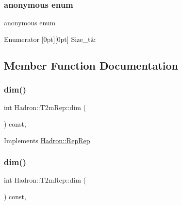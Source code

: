 \subsubsection{\texorpdfstring{anonymous enum}{anonymous enum}}
{\footnotesize\ttfamily anonymous enum}

\begin{DoxyEnumFields}{Enumerator}
[0pt][0pt]{}\mbox{\label{structHadron_1_1T2mRep_a417a4cdbefb5dafff1b57b70cbc10db8aa4b0f5962e540dfe4d59e9ece3dfdada}} 
Size\+\_\+t&\\
\hline

\end{DoxyEnumFields}


\subsection{Member Function Documentation}
\mbox{\label{structHadron_1_1T2mRep_abd34f4a53af78200eaf2e03661f8af73}} 
\subsubsection{\texorpdfstring{dim()}{dim()}\hspace{0.1cm}{\footnotesize\ttfamily [1/5]}}
{\footnotesize\ttfamily int Hadron\+::\+T2m\+Rep\+::dim (\begin{DoxyParamCaption}{ }\end{DoxyParamCaption}) const\hspace{0.3cm}{\ttfamily [inline]}, {\ttfamily [virtual]}}



Implements \mbox{\hyperlink{structHadron_1_1RepRep_a92c8802e5ed7afd7da43ccfd5b7cd92b}{Hadron\+::\+Rep\+Rep}}.

\mbox{\label{structHadron_1_1T2mRep_abd34f4a53af78200eaf2e03661f8af73}} 
\subsubsection{\texorpdfstring{dim()}{dim()}\hspace{0.1cm}{\footnotesize\ttfamily [2/5]}}
{\footnotesize\ttfamily int Hadron\+::\+T2m\+Rep\+::dim (\begin{DoxyParamCaption}{ }\end{DoxyParamCaption}) const\hspace{0.3cm}{\ttfamily [inline]}, {\ttfamily [virtual]}}



